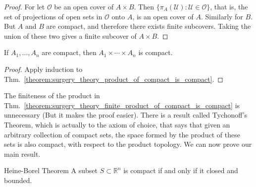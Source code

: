 \documentclass[crop=false,class=book,oneside]{standalone}                      %
\begin{document}
            \begin{proof}
                For let $\mathcal{O}$ be an open cover
                of $A\times{B}$.  Then
                $\{\pi_{A}(\mathcal{U}):\mathcal{U}\in\mathcal{O}\}$,
                that is, the set of projections of open sets in
                $\mathcal{O}$ onto $A$, is an open cover of $A$.
                Similarly for $B$. But $A$ and $B$ are compact, and
                therefore there exists finite subcovers. Taking the
                union of these two gives
                a finite subcover of $A\times{B}$.
            \end{proof}
            \begin{theorem}
                \label{theorem:surgery_theory_finite_product_of_compact_is_compact}
                If $A_{1},\hdots,A_{n}$ are compact,
                then $A_{1}\times\cdots\times{A_{n}}$ is compact.
            \end{theorem}
            \begin{proof}
                Apply induction to
                Thm.~\ref{theorem:surgery_theory_product_of_compact_is_compact}.
            \end{proof}
            The finiteness of the product in
            Thm.~\ref{theorem:surgery_theory_finite_product_of_compact_is_compact}
            is unnecessary (But it makes the proof easier). There
            is a result called Tychonoff's Theorem, which is
            actually to the axiom of choice, that
            says that given an arbitrary collection of compact sets,
            the space formed by the product of these sets is also
            compact, with respect to the product topology.
            We can now prove our main result.
            \begin{ftheorem}{Heine-Borel Theorem}{}
                \label{theorem:surgery_theory_Heine_Borel}
                A subset $S\subset\mathbb{R}^{n}$ is compact if
                and only if it closed and bounded.
            \end{ftheorem}
\end{document}
